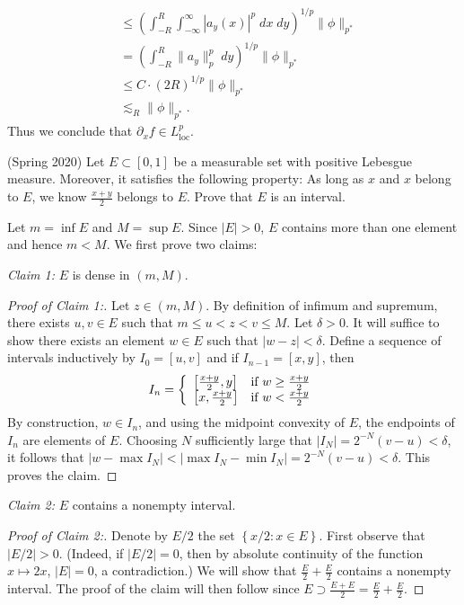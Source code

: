 \documentclass[answers]{exam}
\theoremstyle{problemstyle}
\newcommand{\vt}{\vskip 5mm} %
\newcommand{\1}[1]{\textbf{1}_{\left[#1\right]}} %
\begin{document}
\begin{questions}
\begin{solution}
\begin{align*}
        &\leq \left( \int_{-R}^R \int_{-\infty}^\infty |a_y(x)|^p\; dx\; dy \right)^{1/p} \| \phi \|_{p^*}\\
        &= \left( \int_{-R}^R \| a_y \|_p^p\; dy \right)^{1/p} \| \phi \|_{p^*}\\
        &\leq C \cdot (2R)^{1/p} \| \phi \|_{p^*}\\
        &\lesssim_R \| \phi \|_{p^*}.
    \end{align*}
    Thus we conclude that $\partial_x f \in L^p_{\text{loc}}$.
\end{solution}

\question (Spring 2020)
  Let $E\subset[0,1]$ be a measurable set with positive Lebesgue measure. Moreover, it satisfies the following property: As long as $x$ and $x$ belong to $E$, we know $\frac{x+y}{2}$ belongs to $E$. Prove that $E$ is an interval.
  
  
\begin{solution}
  Let $m=\inf E$ and $M = \sup E$. Since $|E|>0$, $E$ contains more than one element and hence $m<M$. We first prove two claims:

  \vt
  \noindent
  \textit{Claim 1:} $E$ is dense in $(m,M)$.
  \begin{proof}[Proof of Claim 1:]
    Let $z\in (m,M)$.
    By definition of infimum and supremum, there exists $u,v\in E$ such that $m \leq u<z<v\leq M$. Let $\delta>0$. It will suffice to show there exists an element $w\in E$ such that $|w-z|<\delta$. Define a sequence of intervals inductively by $I_{0}= [u,v]$ and if $I_{n-1}=[x,y]$, then
    \begin{equation*}
      I_{n} = \left\{
        \begin{array}{l@{\quad}l}
          \left[ \frac{x+y}{2}, y \right]  & \text{if } w\geq \frac{x+y}{2}\\
          \left[ x, \frac{x+y}{2} \right]  & \text{if } w< \frac{x+y}{2}
        \end{array}\right.
    \end{equation*}
     By construction, $w\in I_{n}$, and using the midpoint convexity of $E$, the endpoints of $I_{n}$ are elements of $E$. Choosing $N$ sufficiently large that $|I_{N}|=2^{-N}(v-u)<\delta$, it follows that $|w-\max I_{N}| < |\max I_{N}-\min I_{N}|= 2^{-N}(v-u)<\delta$. This proves the claim.
   \end{proof}

   \vt
   \noindent
   \textit{Claim 2:} $E$ contains a nonempty interval.
   \begin{proof}[Proof of Claim 2:]
     Denote by $E/2$ the set $\left\{ x/2 : x\in E   \right\}$. First observe that $|E/2|>0$. (Indeed, if $|E/2|=0$, then by absolute continuity of the function $x\mapsto 2x$, $|E|=0$, a contradiction.) We will show that $\frac{E}{2}+\frac{E}{2}$ contains a nonempty interval. The proof of the claim will then follow since $ E\supset \frac{E+E}{2}=\frac{E}{2}+\frac{E}{2}.$
     

\end{proof}
\end{solution}
\end{questions}
\end{document}
